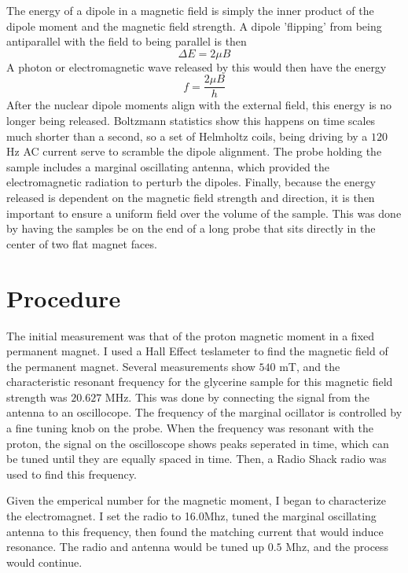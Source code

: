 \documentclass[twocolumn]{article}
\begin{document}
The energy of a dipole in a magnetic field is simply the inner product of the dipole moment
and the magnetic field strength. A dipole 'flipping' from being antiparallel with the field to being
parallel is then
\begin{equation}
\Delta E = 2 \mu B
\end{equation}
A photon or electromagnetic wave released by this would then have the energy
\begin{equation}
f = \frac{2 \mu B}{h}
\end{equation}
After the nuclear dipole moments align with the external field, this energy is no longer
being released. Boltzmann statistics show this happens on time scales much shorter than a second,
so a set of Helmholtz coils, being driving by a $120$ Hz AC current serve to scramble the
dipole alignment.
The probe holding the sample includes a marginal oscillating antenna, which provided the
electromagnetic radiation to perturb the dipoles.
Finally, because the energy released is dependent on the magnetic field strength and direction,
it is then important to ensure a uniform field over the volume of the sample. This was done
by having the samples be on the end of a long probe that sits directly in the center of
two flat magnet faces.

\section*{Procedure}

The initial measurement was that of the proton magnetic moment in a fixed permanent magnet. I used a
Hall Effect teslameter to find the magnetic field of the permanent magnet. Several measurements show $540$ mT, and
the characteristic resonant frequency for the glycerine sample for this magnetic field strength was $20.627$ MHz. This was done by connecting
the signal from the antenna to an oscillocope. The frequency of the marginal ocillator is controlled
by a fine tuning knob on the probe. When the frequency was resonant with the proton, the signal on the oscilloscope
shows peaks seperated in time, which can be tuned until they are equally spaced in time. Then, a Radio Shack radio was
used to find this frequency.

Given the emperical number for the magnetic moment, I began to characterize the electromagnet. I set the
radio to 16.0Mhz, tuned the marginal oscillating antenna to this frequency, then found the matching current
that would induce resonance. The radio and antenna would be tuned up $0.5$ Mhz, and the process would continue.
\end{document}
